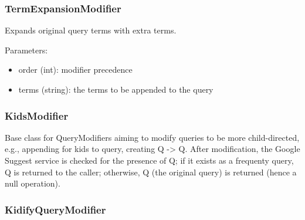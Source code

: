 \documentclass[letterpaper,10pt,english]{sphinxmanual}
\begin{document}
\subsubsection{TermExpansionModifier}
\label{api3.0:termexpansionmodifier}

\begin{fulllineitems}
\label{api3.0:puppy.query.modifier.TermExpansionModifier}
Expands original query terms with extra terms.

Parameters:
\begin{itemize}
\item {} 
order (int): modifier precedence

\item {} 
terms (string): the terms to be appended to the query

\end{itemize}

\end{fulllineitems}



\subsubsection{KidsModifier}
\label{api3.0:kidsmodifier}

\begin{fulllineitems}
\label{api3.0:puppy.query.modifier.KidsModifier}
Base class for QueryModifiers aiming to modify queries to be more
child-directed, e.g., appending for kids to query, creating Q -\textgreater{} Q.
After modification, the Google Suggest service is checked for the
presence of Q; if it exists as a frequenty query, Q is returned to
the caller; otherwise, Q (the original query) is returned (hence a null
operation).

\end{fulllineitems}



\subsubsection{KidifyQueryModifier}
\label{api3.0:kidifyquerymodifier}
\end{document}
